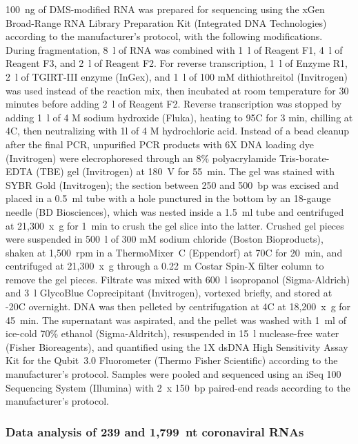 \documentclass[main.tex]{subfiles}
\begin{document}
100~ng of DMS-modified RNA was prepared for sequencing using the xGen Broad-Range RNA Library Preparation Kit (Integrated DNA Technologies) according to the manufacturer’s protocol, with the following modifications.
During fragmentation, 8~\textmu l of RNA was combined with 1~\textmu l of Reagent F1, 4~\textmu l of Reagent F3, and 2~\textmu l of Reagent F2. 
For reverse transcription, 1~\textmu l of Enzyme R1, 2~\textmu l of TGIRT-III enzyme (InGex), and 1~\textmu l of 100 mM dithiothreitol (Invitrogen) was used instead of the reaction mix, then incubated at room temperature for 30 minutes before adding 2~\textmu l of Reagent F2.
Reverse transcription was stopped by adding 1~\textmu l of 4 M sodium hydroxide (Fluka), heating to 95\textdegree C for 3 min, chilling at 4\textdegree C, then neutralizing with 1\textmu l of 4 M hydrochloric acid.
Instead of a bead cleanup after the final PCR, unpurified PCR products with 6X DNA loading dye (Invitrogen) were elecrophoresed through an 8\% polyacrylamide Tris-borate-EDTA (TBE) gel (Invitrogen) at 180~V for 55~min.
The gel was stained with SYBR Gold (Invitrogen); the section between 250 and 500~bp was excised and placed in a 0.5~ml tube with a hole punctured in the bottom by an 18-gauge needle (BD Biosciences), which was nested inside a 1.5~ml tube and centrifuged at 21,300~x~g for 1~min to crush the gel slice into the latter.
Crushed gel pieces were suspended in 500~\textmu l of 300 mM sodium chloride (Boston Bioproducts), shaken at 1,500~rpm in a ThermoMixer~C (Eppendorf) at 70\textdegree C for 20~min, and centrifuged at 21,300~x~g through a 0.22~\textmu m Costar Spin-X filter column to remove the gel pieces.
Filtrate was mixed with 600~\textmu l isopropanol (Sigma-Aldrich) and 3~\textmu l GlycoBlue Coprecipitant (Invitrogen), vortexed briefly, and stored at -20\textdegree C overnight.
DNA was then pelleted by centrifugation at 4\textdegree C at 18,200~x~g for 45~min.
The supernatant was aspirated, and the pellet was washed with 1~ml of ice-cold 70\% ethanol (Sigma-Aldritch), resuspended in 15~\textmu l nuclease-free water (Fisher Bioreagents), and quantified using the 1X dsDNA High Sensitivity Assay Kit for the Qubit~3.0 Fluorometer (Thermo Fisher Scientific) according to the manufacturer's protocol.
Samples were pooled and sequenced using an iSeq 100 Sequencing System (Illumina) with 2~x 150~bp paired-end reads according to the manufacturer's protocol.

\subsubsection{Data analysis of 239 and 1,799~nt coronaviral RNAs}
\end{document}
